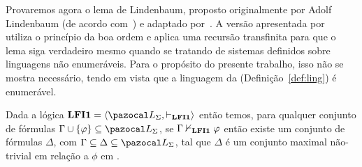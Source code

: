    Provaremos agora o lema de Lindenbaum, proposto originalmente por Adolf Lindenbaum (de acordo com~) e adaptado por~. A versão apresentada por~ utiliza o princípio da boa ordem e aplica uma recursão transfinita para que o lema siga verdadeiro mesmo quando se tratando de sistemas definidos sobre linguagens não enumeráveis. Para o propósito do presente trabalho, isso não se mostra necessário, tendo em vista que a linguagem da \lfium{} (Definição~\ref{def:ling}) é enumerável.

    \begin{lema}\label{lem:lindenbaum}
        Dada a lógica $\lfium{} = \langle \ling, \conhil \rangle$ então temos, para qualquer conjunto de fórmulas $\Gamma \cup \{\phi\} \subseteq \ling$, se $\Gamma \nvdash_{{\normalfont\textbf{LFI1}}{}} \varphi$ então existe um conjunto de fórmulas $\Delta$, com $\Gamma \subseteq \Delta \subseteq \ling$, tal que $\Delta$ é um conjunto maximal não-trivial em relação a $\phi$ em \lfium{}.
    \end{lema}

